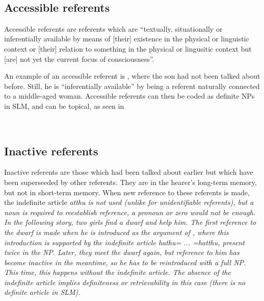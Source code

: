  \\



\subsection{Accessible referents}\label{sec:disc:Accessiblereferents}
Accessible referents are referents which are ``textually, situationally or inferentially available by means of [their] existence in the physical or linguistic context or [their] relation to something in the physical or lingusitic context but [are] not yet the current focus of consciousness''\citep[200]{VanValinEtAl1997}.

An example of an accessible referent is  , where the son   had not been talked about before. Still, he is ``inferentially available'' by being a referent naturally connected to a middle-aged woman. Accessible referents can then be coded as definite NPs in SLM, and can be topical, as seen in 

 \\




\subsection{Inactive referents}\label{sec:disc:Unretrievablereferents}
Inactive referents are those which had been talked about earlier but which have been superseeded by other referents. They are in the hearer's long-term memory, but not in short-term memory. When new reference to these referents is made, the indefinite article \em atthu \em is not used (unlike for unidentifiable referents), but a noun is required to reestablish reference, a pronoun or zero would not be enough. In the following story, two girls find a dwarf and help him. The first reference to the dwarf is made when he is introduced as the argument of , where this introduction is supported by the indefinite article \em hathu= ... =hatthu\em, present twice in the NP.  Later, they meet the dwarf again, but reference to him has become inactive in the meantime, so he has to be reintroduced with a full NP. This time, this happens without  the indefinite article. The absence of the indefinite article implies definiteness or retrievability in this case (there is no definite article in SLM).

